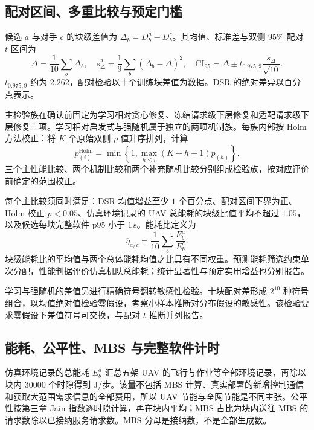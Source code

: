 \subsection{配对区间、多重比较与预定门槛}

候选 $a$ 与对手 $c$ 的块级差值为 $\Delta_b=D_b^a-D_b^c$。其均值、标准差与双侧 $95\%$ 配对 $t$ 区间为
\begin{equation}
 \overline\Delta=\frac1{10}\sum_b\Delta_b,\quad
 s_\Delta^2=\frac1{9}\sum_b(\Delta_b-\overline\Delta)^2,\quad
 \mathrm{CI}_{95}=\overline\Delta\pm t_{0.975,9}\frac{s_\Delta}{\sqrt{10}}.
 \label{legacy:eq:ch5-paired-ci}
\end{equation}
$t_{0.975,9}$ 约为 $2.262$，配对检验以十个训练块差值为数据。DSR 的绝对差异以百分点表示。

主检验族在确认前固定为学习相对贪心修复、冻结请求级下层修复和适配请求级下层修复三项。学习相对启发式与强随机属于独立的两项机制族。每族内部按 Holm 方法校正：将 $K$ 个原始双侧 $p$ 值升序排列，计算
\begin{equation}
 p_{(i)}^{\mathrm{Holm}}=
 \min\left\{1,\max_{h\le i}(K-h+1)p_{(h)}\right\}.
 \label{legacy:eq:ch5-holm}
\end{equation}
三个主性能比较、两个机制比较和两个补充随机比较分别组成检验族，按对应评价前确定的范围校正。

每个主比较须同时满足：DSR 均值增益至少 $1$ 个百分点、配对区间下界为正、Holm 校正 $p<0.05$、仿真环境记录的 UAV 总能耗的块级比值平均不超过 $1.05$，以及候选每块完整软件 p95 小于 $1\,\mathrm{s}$。能耗比定义为
\begin{equation}
 \overline\eta_{a/c}=\frac1{10}\sum_b\frac{E_b^a}{E_b^c}.
 \label{legacy:eq:ch5-energy-ratio}
\end{equation}
块级能耗比的平均值与两个总体能耗均值之比具有不同权重。预测能耗筛选约束单次分配，性能判据评价仿真机队总能耗；统计显著性与预定实用增益也分别报告。

学习与强随机的差值另进行精确符号翻转敏感性检验。十块配对差形成 $2^{10}$ 种符号组合，以均值绝对值检验零假设，考察小样本推断对分布假设的敏感性。该检验要求零假设下差值符号可交换，与配对 $t$ 推断并列报告。

\subsection{能耗、公平性、MBS 与完整软件计时}

仿真环境记录的总能耗 $E_b^a$ 汇总五架 UAV 的飞行与作业等全部环境记录，再除以块内 $30000$ 个时隙得到 J/步。该量不包括 MBS 计算、真实部署的新增控制通信和获取大范围需求信息的全部费用，所以 UAV 节能与全网节能是不同主张。公平性按第三章 Jain 指数逐时隙计算，再在块内平均；MBS 占比为块内送往 MBS 的请求数除以已接纳服务请求数。MBS 分母是接纳数，不是全部生成数。

